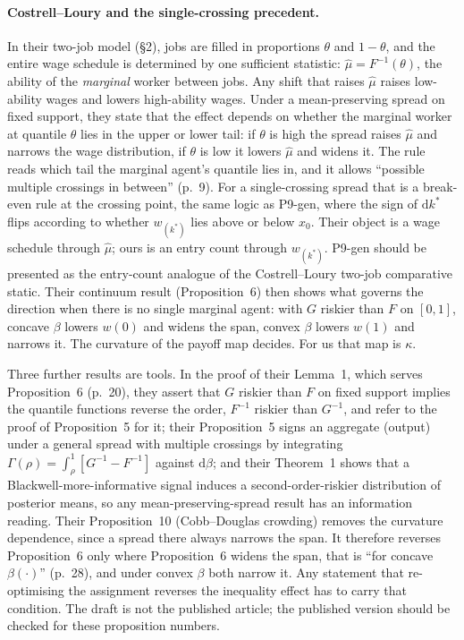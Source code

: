 \documentclass[11pt,a4paper]{article}
\begin{document}
\paragraph{Costrell--Loury and the single-crossing precedent.} In their two-job
model (\S2), jobs are filled in proportions $\theta$ and $1-\theta$, and the
entire wage schedule is determined by one sufficient statistic: $\hat\mu =
F^{-1}(\theta)$, the ability of the \emph{marginal} worker between jobs. Any
shift that raises $\hat\mu$ raises low-ability wages and lowers high-ability
wages. Under a mean-preserving spread on fixed support, they state that the
effect depends on whether the marginal worker at quantile $\theta$ lies in the
upper or lower tail: if $\theta$ is high the spread raises $\hat\mu$ and
narrows the wage distribution, if $\theta$ is low it lowers $\hat\mu$ and
widens it. The rule reads which tail the marginal agent's quantile lies in, and
it allows ``possible multiple crossings in between'' (p.~9). For a
single-crossing spread that is a break-even rule at the crossing point, the
same logic as P9-gen, where the sign of $\mathrm{d}k^*$ flips according to
whether $w_{(k^*)}$ lies above or below $x_0$. Their object is a wage schedule through $\hat\mu$; ours
is an entry count through $w_{(k^*)}$. P9-gen should be presented as the
entry-count analogue of the Costrell--Loury two-job comparative static. Their
continuum result (Proposition~6) then shows what governs the direction when
there is no single marginal agent: with $G$ riskier than $F$ on $[0,1]$,
concave $\beta$ lowers $w(0)$ and widens the span, convex $\beta$ lowers $w(1)$
and narrows it. The curvature of the payoff map decides. For us that map is
$\kappa$.

Three further results are tools. In the proof of their Lemma~1, which serves
Proposition~6 (p.~20), they assert that $G$ riskier than $F$ on fixed support
implies the quantile functions reverse the order, $F^{-1}$ riskier than
$G^{-1}$, and refer to the proof of Proposition~5 for it; their
Proposition~5 signs an aggregate (output) under a general spread with multiple
crossings by integrating $\Gamma(\rho) = \int_\rho^1 [G^{-1} - F^{-1}]$ against
$\mathrm{d}\beta$; and their Theorem~1 shows that a Blackwell-more-informative
signal induces a second-order-riskier distribution of posterior means, so any
mean-preserving-spread result has an information reading. Their Proposition~10
(Cobb--Douglas crowding) removes the curvature dependence, since a spread there
always narrows the span. It therefore reverses Proposition~6 only where
Proposition~6 widens the span, that is ``for concave $\beta(\cdot)$'' (p.~28),
and under convex $\beta$ both narrow it. Any statement that re-optimising the
assignment reverses the inequality effect has to carry that condition. The
draft is not the published article; the
published version should be checked for these proposition numbers.
\end{document}
